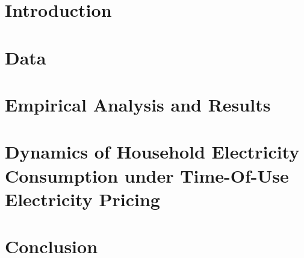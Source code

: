 \section{Introduction}
\label{Section:Introduction}



\section{Data}
\label{Section:Data}



\section{Empirical Analysis and Results}
\label{Section:Empirical-Analysis-and-Results}



\section{Dynamics of Household Electricity Consumption under Time-Of-Use Electricity Pricing}
\label{Section:Dynamics-of-Household-Electricity-Consumption-under-TOU-Electricity-Pricing}



\section{Conclusion}
\label{Section:Conclusion}



\clearpage
